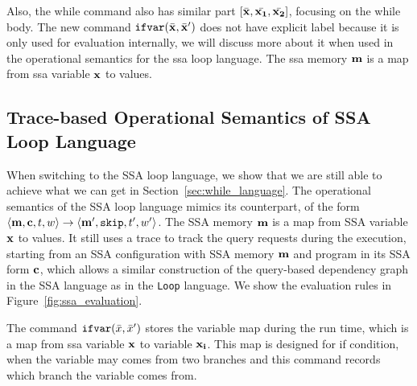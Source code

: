 \documentclass[a4paper,11pt]{article}
\begin{document}
{
Also, the while command also has similar part $ [\bar{\mathbf{{x}}}, \bar{\mathbf{{x_1}}}, \bar{\mathbf{{x_2}}}]$, focusing on the while body. 
The new command ${{\mathtt{ifvar}(\bar{\mathbf{{x}}}, \bar{\mathbf{{x}}}')}}$ does not have explicit label because it is only used for evaluation internally, we will discuss more about it when used in the operational semantics for the ssa loop language. 
The ssa memory $\mathbf{{m}}$ is a map from ssa variable $\mathbf{{x}}$ to values.
}
%
%
{
\subsection{Trace-based Operational Semantics of SSA Loop Language}
When switching to the SSA loop language, we show that we are still able to achieve what we can get in Section~\ref{sec:while_language}. The operational semantics of the SSA loop language mimics its counterpart, of the form $\langle \mathbf{{m}}, \mathbf{{c}}, t, w \rangle \to \langle \mathbf{{m'}}, \mathtt{skip}, t', w' \rangle$. The SSA memory $\mathbf{{m}}$ is a map from SSA variable $\mathbf{{x}}$ to values. It still uses a trace to track the query requests during the execution, starting from an SSA configuration with SSA memory $\mathbf{{m}}$ and program in its SSA form $\mathbf{{c}}$, which allows a similar construction of the query-based dependency graph in the SSA language as in the {\tt Loop} language.
We show the evaluation rules in Figure~\ref{fig:ssa_evaluation}.
}
%
The command 
$\mathsf{\mathtt{ifvar}}(\bar{x},\bar{x}')$ stores the variable map during the run time, which is a map from ssa variable $\mathbf{{x}}$ to variable $\mathbf{{x_i}}$. This map is designed for if condition, when the variable may comes from two branches and this command records which branch the variable comes from. 
%
\end{document}

